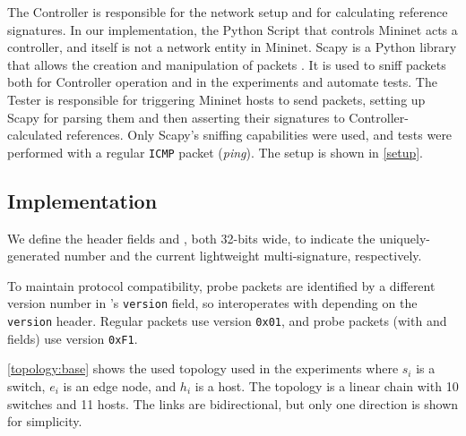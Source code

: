 The Controller is responsible for the network setup and for calculating reference signatures.
In our implementation, the Python Script that controls Mininet acts a controller, and itself is not a network entity in Mininet.
Scapy is a Python library that allows the creation and manipulation of packets \cite{scapy}. It is used to sniff packets both for Controller operation and in the experiments and automate tests. 
The Tester is responsible for triggering Mininet hosts to send packets, setting up Scapy for parsing them and then asserting their signatures to Controller-calculated references. Only Scapy's sniffing capabilities were used, and tests were performed with a regular \texttt{ICMP} packet (\textit{ping}).
The setup is shown in \autoref{setup}. 


\subsection{Implementation}

We define the header fields \timestamp and \lhash, both 32-bits wide, to indicate the uniquely-generated number and the current lightweight multi-signature, respectively.

To maintain \polka protocol compatibility, probe packets are identified by a different version number in \polka's \texttt{version} field, so interoperates with \polka depending on the \texttt{version} header. Regular \polka packets use version \texttt{0x01}, and probe packets (with \timestamp and \lhash fields) use version \texttt{0xF1}.

\autoref{topology:base} shows the used topology used in the experiments where $s_i$ is a switch, $e_i$ is an edge node, and $h_i$ is a host. The topology is a linear chain with 10 switches and 11 hosts. The links are bidirectional, but only one direction is shown for simplicity. %

